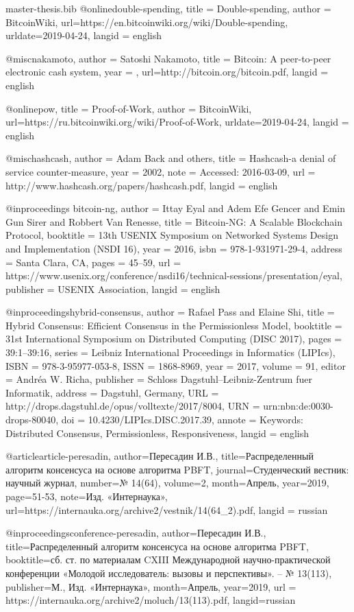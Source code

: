 \begin{filecontents}{master-thesis.bib}
@online{double-spending,
  title = {Double-spending},
  author = {BitcoinWiki},
  url={https://en.bitcoinwiki.org/wiki/Double-spending},
  urldate={2019-04-24},
  langid = {english}
}

@misc{nakamoto,
    author = {Satoshi Nakamoto},
    title = {Bitcoin: A peer-to-peer electronic cash system},
    year = {},
    url={http://bitcoin.org/bitcoin.pdf},
    langid = {english}
}

@online{pow,
  title = {Proof-of-Work},
  author = {BitcoinWiki},
  url={https://ru.bitcoinwiki.org/wiki/Proof-of-Work},
  urldate={2019-04-24},
  langid = {english}
}

@misc{hashcash,
  author = {Adam Back and others},
  title = {Hashcash-a denial of service counter-measure},
  year = {2002},
  note = {Accessed: 2016-03-09},
  url = {http://www.hashcash.org/papers/hashcash.pdf},
  langid = {english}
}

@inproceedings {bitcoin-ng,
  author = {Ittay Eyal and Adem Efe Gencer and Emin Gun Sirer and Robbert Van Renesse},
  title = {Bitcoin-NG: A Scalable Blockchain Protocol},
  booktitle = {13th {USENIX} Symposium on Networked Systems Design and Implementation ({NSDI} 16)},
  year = {2016},
  isbn = {978-1-931971-29-4},
  address = {Santa Clara, CA},
  pages = {45--59},
  url = {https://www.usenix.org/conference/nsdi16/technical-sessions/presentation/eyal},
  publisher = {{USENIX} Association},
  langid = {english}
}

@inproceedings{hybrid-consensus,
  author =	{Rafael Pass and Elaine Shi},
  title =	{{Hybrid Consensus: Efficient Consensus in the Permissionless Model}},
  booktitle =	{31st International Symposium on Distributed Computing (DISC 2017)},
  pages =	{39:1--39:16},
  series =	{Leibniz International Proceedings in Informatics (LIPIcs)},
  ISBN =	{978-3-95977-053-8},
  ISSN =	{1868-8969},
  year =	{2017},
  volume =	{91},
  editor =	{Andr{\'e}a W. Richa},
  publisher =	{Schloss Dagstuhl--Leibniz-Zentrum fuer Informatik},
  address =	{Dagstuhl, Germany},
  URL =		{http://drops.dagstuhl.de/opus/volltexte/2017/8004},
  URN =		{urn:nbn:de:0030-drops-80040},
  doi =		{10.4230/LIPIcs.DISC.2017.39},
  annote =	{Keywords: Distributed Consensus, Permissionless, Responsiveness},
  langid = {english}
}

@article{article-peresadin,
  author={Пересадин И.В.},
  title={{Распределенный алгоритм консенсуса на основе алгоритма PBFT}},
  journal={Студенческий вестник: научный журнал},
  number={№ 14(64)},
  volume={2},
  month={Апрель},
  year={2019},
  page={51-53},
  note={Изд. «Интернаука»},
  url={https://internauka.org/archive2/vestnik/14(64_2).pdf},
  langid = {russian}
}

@inproceedings{conference-peresadin,
  author={Пересадин И.В.},
  title={{Распределенный алгоритм консенсуса на основе алгоритма PBFT}},
  booktitle={сб. ст. по материалам CXIII Международной научно-практической конференции «Молодой исследователь: вызовы и перспективы». – № 13(113)},
  publisher={М., Изд. «Интернаука»},
  month={Апрель},
  year={2019},
  url = {https://internauka.org/archive2/moluch/13(113).pdf},
  langid={russian}
}
\end{filecontents}